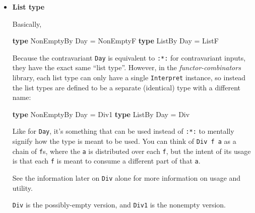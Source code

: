 \documentclass[]{article}
\newenvironment{Shaded}{}{}
\newcommand{\DataTypeTok}[1]{\textcolor[rgb]{0.56,0.13,0.00}{#1}}
\newcommand{\KeywordTok}[1]{\textcolor[rgb]{0.00,0.44,0.13}{\textbf{#1}}}
\newcommand{\NormalTok}[1]{#1}
\newcommand{\OtherTok}[1]{\textcolor[rgb]{0.00,0.44,0.13}{#1}}
\renewcommand{\href}[2]{#2\footnote{\url{#1}}}
\begin{document}
\begin{itemize}
  \texttt{Divisible} from
  \emph{\href{https://hackage.haskell.org/package/contravariant/docs/Data-Functor-Contravariant-Divisible.html}{Data.Functor.Contravariant.Divisible}},
  adds an identity that will ignore anything it is given: \texttt{conquer.}

\begin{Shaded}
\begin{Highlighting}[]
\KeywordTok{class} \DataTypeTok{Divise}\NormalTok{ f }\OtherTok{=\textgreater{}} \DataTypeTok{Divisible}\NormalTok{ f }\KeywordTok{where}
\OtherTok{    conquer ::}\NormalTok{ f a}
\end{Highlighting}
\end{Shaded}

  (note: like with \texttt{Applicative} and \texttt{Apply}, the actual version
  requires only \texttt{Contravariant\ f}; \texttt{Divise} isn't an actual
  superclass, even though it should be.)
\item
  \textbf{List type}

  Basically,

\begin{Shaded}
\begin{Highlighting}[]
\KeywordTok{type} \DataTypeTok{NonEmptyBy} \DataTypeTok{Day} \OtherTok{=} \DataTypeTok{NonEmptyF}
\KeywordTok{type} \DataTypeTok{ListBy}     \DataTypeTok{Day} \OtherTok{=} \DataTypeTok{ListF}
\end{Highlighting}
\end{Shaded}

  Because the contravariant \texttt{Day} is equivalent to \texttt{:*:} for
  contravariant inputs, they have the exact same ``list type''. However, in the
  \emph{functor-combinators} library, each list type can only have a single
  \texttt{Interpret} instance, so instead the list types are defined to be a
  separate (identical) type with a different name:

\begin{Shaded}
\begin{Highlighting}[]
\KeywordTok{type} \DataTypeTok{NonEmptyBy} \DataTypeTok{Day} \OtherTok{=} \DataTypeTok{Div1}
\KeywordTok{type} \DataTypeTok{ListBy}     \DataTypeTok{Day} \OtherTok{=} \DataTypeTok{Div}
\end{Highlighting}
\end{Shaded}

  Like for \texttt{Day}, it's something that can be used instead of \texttt{:*:}
  to mentally signify how the type is meant to be used. You can think of
  \texttt{Div\ f\ a} as a chain of \texttt{f}s, where the \texttt{a} is
  distributed over each \texttt{f}, but the intent of its usage is that each
  \texttt{f} is meant to consume a different part of that \texttt{a}.

  See the information later on \texttt{Div} alone for more information on usage
  and utility.

  \texttt{Div} is the possibly-empty version, and \texttt{Div1} is the nonempty
  version.
\end{itemize}
\end{document}
